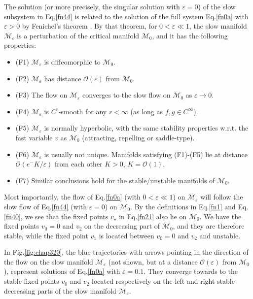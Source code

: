 The solution (or more precisely, the singular solution with $\varepsilon=0$) of the slow subsystem in Eq.\eqref{fn44} is related to the solution
of the full system Eq.\eqref{fn0a} with $\varepsilon>0$ by  Fenichel's theorem \cite{Feni1,Feni}.
By that  theorem, for $0<\varepsilon\ll1$, the  slow manifold $\mathcal{M}_{\varepsilon}$ is a perturbation of the critical manifold $\mathcal{M}_0$, and it has the following properties:
\begin{itemize}
 \item (F1) $\mathcal{M}_{\varepsilon}$ is diffeomorphic to $\mathcal{M}_0$.
 \item (F2) $\mathcal{M}_{\varepsilon}$ has  distance $\mathcal{O}(\varepsilon)$ from $\mathcal{M}_0$.
 \item (F3) The flow on $\mathcal{M}_{\varepsilon}$ converges to the slow flow on $\mathcal{M}_0$ as $\varepsilon \rightarrow 0$.
 \item (F4) $\mathcal{M}_{\varepsilon}$ is $C^r$-smooth for any $r<\infty$ (as long as $f,g\in C^\infty$).
 \item (F5) $\mathcal{M}_{\varepsilon}$ is normally hyperbolic, with the same stability properties w.r.t. the
fast variable $v$ as $\mathcal{M}_0$ (attracting, repelling or saddle-type).
 \item (F6) $\mathcal{M}_{\varepsilon}$ is usually not unique. Manifolds satisfying (F1)-(F5) lie at
distance $\mathcal{O}(e^-{K /\varepsilon})$ from each other $K>0$, $K=\mathcal{O}(1)$.
 \item (F7) Similar conclusions hold for the stable/unstable manifolds of $\mathcal{M}_0$.
\end{itemize}
Most importantly, the
flow of Eq.\eqref{fn0a} (with $0<\varepsilon\ll1$) on $\mathcal{M}_{\varepsilon}$  will 
follow the slow flow of Eq.\eqref{fn44} (with $\varepsilon=0$) on $\mathcal{M}_0$.
By the definitions in Eq.\eqref{fn1} and Eq.\eqref{fn40}, we see that the fixed points
$v_\star$ in 
Eq.\eqref{fn21} also lie on $\mathcal{M}_0$. We have the fixed points $v_0=0$ and $v_2$
 on the decreasing part of $\mathcal{M}_0$, and they are therefore stable, while the fixed point $v_1$ is 
located between $v_0=0$ and $v_2$ and  unstable. 

In Fig.\ref{fig:chap320}, the blue trajectories with arrows pointing in the direction of the flow
on the slow manifold $\mathcal{M}_{\varepsilon}$ (not shown, but at a distance $\mathcal{O}(\varepsilon)$ from $\mathcal{M}_0$), represent solutions
of Eq.\eqref{fn0a} with $\varepsilon=0.1$.
They converge towards to the stable fixed points $v_0$ and $v_2$ 
located respectively on the left and right stable decreasing parts of the slow manifold $\mathcal{M}_{\varepsilon}$.

